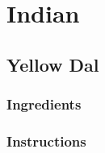 \documentclass[11pt]{article}
\begin{document}
\section{Indian}
\label{sec:org50518c6}
\subsection{Yellow Dal}
\label{sec:orgf5936a6}
\subsubsection*{Ingredients}
\label{sec:org49d2dd7}
\subsubsection*{Instructions}
\label{sec:org2733511}
\section{}
\label{sec:org3be1a00}
\end{document}
